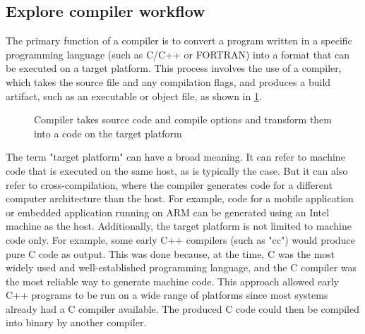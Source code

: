 \subsection{Explore compiler workflow}

The primary function of a compiler is to convert a program written in a specific
programming language (such as C/C++ or FORTRAN) into a format that can be
executed on a target platform. This process involves the use of a compiler,
which takes the source file and any compilation flags, and produces a build
artifact, such as an executable or object file, as shown in
\cref{fig:compiler}. 
\begin{figure}
  \begin{center}
  \end{center}
  \caption{Compiler takes source code and compile options and transform them
    into a code on the target platform}
  \label{fig:compiler}
\end{figure}
The term "target platform" can have a broad meaning. It can refer to machine
code that is executed on the same host, as is typically the case. But it can
also refer to cross-compilation, where the compiler generates code for a
different computer architecture than the host. For example, code for a mobile
application or embedded application running on ARM can be generated using an
Intel machine as the host. Additionally, the target platform is not limited to
machine code only. For example, some early C++ compilers (such as "cc") would
produce pure C code as output. This was done because, at the time, C was the
most widely used and well-established programming language, and the C compiler
was the most reliable way to generate machine code. This approach allowed early
C++ programs to be run on a wide range of platforms since most systems already
had a C compiler available. The produced C code could then be compiled into
binary by another compiler.   

